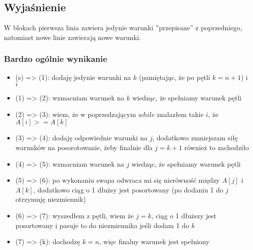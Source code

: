 \documentclass[final,11pt]{article}
\begin{document}
   \subsection{Wyjaśnienie}

   W blokach {} pierwsza linia zawiera jedynie warunki ''przepisane'' z poprzedniego,
   natomiast nowe linie zawierają nowe warunki.

   \subsubsection{Bardzo ogólnie wynikanie}

   \begin{itemize}
      \item
      (s) => (1): dodaję jedynie warunki na $k$
      (pamiętając, że po pętli $k = n + 1$) i $i$

      \item
      (1) => (2): wzmacniam warunek na $k$ wiedząc, że spełniamy warunek pętli

      \item
      (2) => (3): wiem, że w poprzedzającym $while$ znalazłem takie $i$,
      że $A[i] >= A[k]$

      \item
      (3) => (4): dodaję odpowiednie warunki na $j$,
      dodatkowo zmniejszam siłę warunków na posorotowanie,
      żeby finalnie dla $j = k + 1$ również to zachodziło

      \item
      (4) => (5): wzmacniam warunek na $j$ wiedząc, że spełniamy warunek pętli

      \item
      (5) => (6): po wykonaniu swapa odwraca mi się nierówność między
      $A[j]$ i $A[k]$, dodatkowo ciąg o 1 dłużsy jest posortowany
      (po dodaniu 1 do $j$ otrzymuję niezmiennik)

      \item
      (6) => (7): wyszedłem z pętli, wiem że $j = k$, ciąg o 1 dłuższy jest posortowany i pasuje to do niezmiennika jeśli dodam 1 do $k$

      \item
      (7) => (k): dochodzę $k = n$, więc finalny warunek jest spełniony

   \end{itemize}
\end{document}
